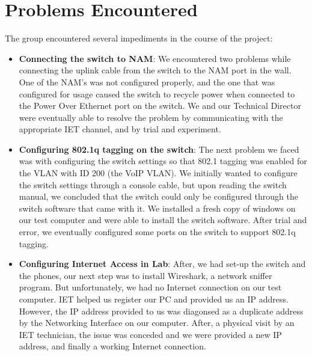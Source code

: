 \section{Problems Encountered}

The group encountered several impediments in the course of the project:

\begin{itemize}

\item \textbf{Connecting the switch to NAM}: We encountered two problems while connecting the uplink cable from the switch to the NAM port in the wall. One of the NAM's was not configured properly, and the one that was configured for usage caused the switch to recycle power when connected to the Power Over Ethernet port on the switch. We and our Technical Director were eventually able to resolve the problem by communicating with the appropriate IET channel, and by trial and experiment.

\item \textbf{Configuring 802.1q tagging on the switch}: The next problem we faced was with configuring the switch settings so that 802.1 tagging was enabled for the VLAN with ID 200 (the VoIP VLAN). We initially wanted to configure the switch settings through a console cable, but upon reading the switch manual, we concluded that the switch could only be configured through the switch software that came with it. We installed a fresh copy of windows on our test computer and were able to install the switch software. After trial and error, we eventually configured some ports on the switch to support 802.1q tagging.


\item \textbf{Configuring Internet Access in Lab}: After, we had set-up the switch and the phones, our next step was to install Wireshark, a network sniffer program. But unfortunately, we had no Internet connection on our test computer. IET helped us register our PC and provided us an IP address. However, the IP address provided to us was diagonsed as a duplicate address by the Networking Interface on our computer. After, a physical visit by an IET technician, the issue was conceded and we were provided a new IP address, and finally a working Internet connection. 

\end{itemize}
